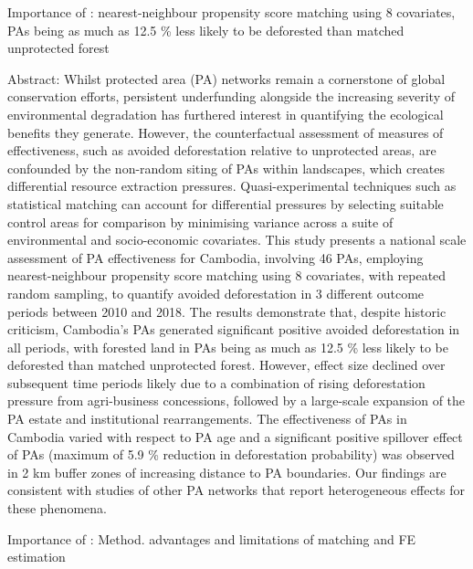 \documentclass{article}
\begin{document}
Importance of \citep{black2022counterfactual}: nearest-neighbour propensity score matching using 8 covariates, PAs being as much as 12.5 \% less likely to be deforested than matched unprotected forest

Abstract: Whilst protected area (PA) networks remain a cornerstone of global conservation efforts,
persistent underfunding alongside the increasing severity of environmental degradation has
furthered interest in quantifying the ecological benefits they generate. However, the counterfactual
assessment of measures of effectiveness, such as avoided deforestation relative to unprotected
areas, are confounded by the non-random siting of PAs within landscapes, which
creates differential resource extraction pressures. Quasi-experimental techniques such as statistical
matching can account for differential pressures by selecting suitable control areas for
comparison by minimising variance across a suite of environmental and socio-economic covariates.
This study presents a national scale assessment of PA effectiveness for Cambodia, involving
46 PAs, employing nearest-neighbour propensity score matching using 8 covariates, with
repeated random sampling, to quantify avoided deforestation in 3 different outcome periods
between 2010 and 2018. The results demonstrate that, despite historic criticism, Cambodia’s PAs
generated significant positive avoided deforestation in all periods, with forested land in PAs being
as much as 12.5 \% less likely to be deforested than matched unprotected forest. However, effect
size declined over subsequent time periods likely due to a combination of rising deforestation
pressure from agri-business concessions, followed by a large-scale expansion of the PA estate and
institutional rearrangements. The effectiveness of PAs in Cambodia varied with respect to PA age
and a significant positive spillover effect of PAs (maximum of 5.9 \% reduction in deforestation
probability) was observed in 2 km buffer zones of increasing distance to PA boundaries. Our
findings are consistent with studies of other PA networks that report heterogeneous effects for
these phenomena.


Importance of \citep{jones2015estimating}: Method. advantages and limitations of matching and FE estimation
\end{document}
